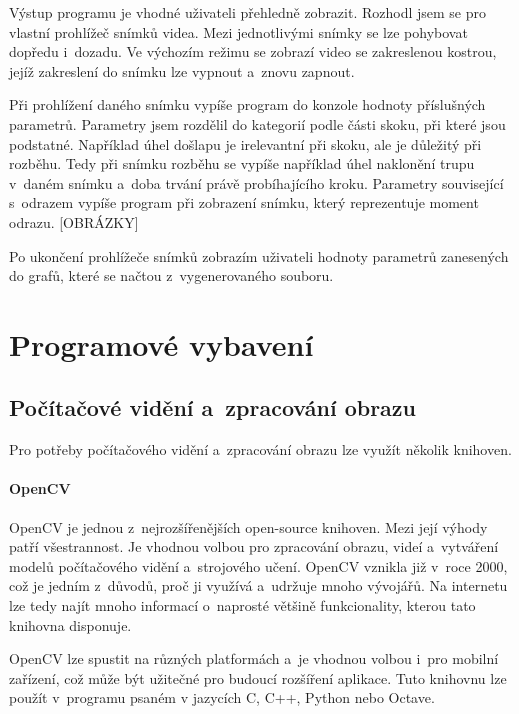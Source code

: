 Výstup programu je vhodné uživateli přehledně zobrazit. Rozhodl jsem se pro vlastní prohlížeč snímků videa. Mezi jednotlivými snímky se lze pohybovat dopředu i~dozadu. Ve výchozím režimu se zobrazí video se zakreslenou kostrou, jejíž zakreslení do snímku lze vypnout a~znovu zapnout.

Při prohlížení daného snímku vypíše program do konzole hodnoty příslušných parametrů. Parametry jsem rozdělil do kategorií podle části skoku, při které jsou podstatné. Například úhel došlapu je irelevantní při skoku, ale je důležitý při rozběhu. Tedy při snímku rozběhu se vypíše například úhel naklonění trupu v~daném snímku a~doba trvání právě probíhajícího kroku. Parametry související s~odrazem vypíše program při zobrazení snímku, který reprezentuje moment odrazu. [OBRÁZKY]

Po ukončení prohlížeče snímků zobrazím uživateli hodnoty parametrů zanesených do grafů, které se načtou z~vygenerovaného souboru.




\section{Programové vybavení}

\subsection{Počítačové vidění a~zpracování obrazu}

Pro potřeby počítačového vidění a~zpracování obrazu lze využít několik knihoven.

\paragraph{OpenCV}

 OpenCV \citep{OpenCV} je jednou z~nejrozšířenějších open-source knihoven. Mezi její výhody patří všestrannost. Je vhodnou volbou pro zpracování obrazu, videí a~vytváření modelů počítačového vidění a~strojového učení. OpenCV vznikla již v~roce 2000, což je jedním z~důvodů, proč ji využívá a~udržuje mnoho vývojářů. Na internetu lze tedy najít mnoho informací o~naprosté většině funkcionality, kterou tato knihovna disponuje.

OpenCV lze spustit na různých platformách a~je vhodnou volbou i~pro mobilní zařízení, což může být užitečné pro budoucí rozšíření aplikace. Tuto knihovnu lze použít v~programu psaném v jazycích C, C++, Python nebo Octave.

